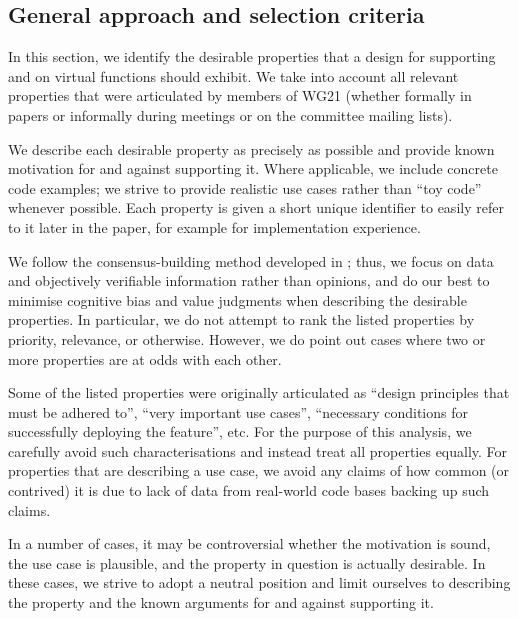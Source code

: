 

\subsection{General approach and selection criteria}

In this section, we identify the desirable properties that a design for supporting  and  on virtual functions should exhibit. We take into account all relevant properties that were articulated by members of WG21 (whether formally in papers or informally during meetings or on the committee mailing lists).

We describe each desirable property as precisely as possible and provide known motivation for and against supporting it. Where applicable, we include concrete code examples; we strive to provide realistic use cases rather than ``toy code'' whenever possible. Each property is given a short unique identifier to easily refer to it later in the paper, for example  for implementation experience.

We follow the consensus-building method developed in \cite{P3684R0}; thus, we focus on data and objectively verifiable information rather than opinions, and do our best to minimise cognitive bias and value judgments when describing the desirable properties. In particular, we do not attempt to rank the listed properties by priority, relevance, or otherwise. However, we do point out cases where two or more properties are at odds with each other.

Some of the listed properties were originally articulated as ``design principles that must be adhered to'',  ``very important use cases'', ``necessary conditions for successfully deploying the feature'', etc. For the purpose of this analysis, we carefully avoid such characterisations and instead treat all properties equally. For properties that are describing a use case, we avoid any claims of how common (or contrived) it is due to lack of data from real-world code bases backing up such claims.

In a number of cases, it may be controversial whether the motivation is sound, the use case is plausible, and the property in question is actually desirable. In these cases, we strive to adopt a neutral position and limit ourselves to describing the property and the known arguments for and against supporting it.

